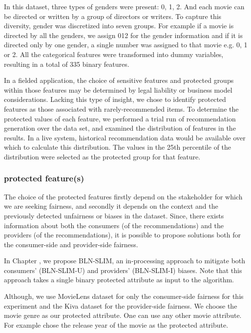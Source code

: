     
     In this dataset, three types of genders were present: 0, 1, 2. And each movie can be directed or written by a group of directors or writers. To capture this diversity, gender was discretized into seven groups. For example if a movie is directed by all the genders, we assign 012 for the gender information and if it is directed only by one gender, a single number was assigned to that movie e.g. 0, 1 or 2. All the categorical features were transformed into dummy variables, resulting in a total of 335 binary features.
    
    In a fielded application, the choice of sensitive features and protected groups within those features may be determined by legal liability or business model considerations. Lacking this type of insight, we chose to identify protected features as those associated with rarely-recommended items. To determine the protected values of each feature, we performed a trial run of recommendation generation over the data set, and examined the distribution of features in the results. In a live system, historical recommendation data would be available over which to calculate this distribution. The values in the 25th percentile of the distribution were selected as the protected group for that feature.

    
        \subsubsection{protected feature(s)}
        The choice of the protected features firstly depend on the stakeholder for which we are seeking fairness, and secondly it depends on the context and the previously detected unfairness or biases in the dataset. Since, there exists information about both the consumers (of the recommendations) and the providers (of the recommendations), it is possible to propose solutions both for the consumer-side and provider-side fairness.
        
        In Chapter , we propose BLN-SLIM, an in-processing approach to mitigate both consumers' (BLN-SLIM-U) and providers' (BLN-SLIM-I) biases. Note that this approach takes a single binary protected attribute as input to the algorithm.
        
        Although, we use MovieLens dataset for only the consumer-side fairness for this experiment and the Kiva dataset for the provider-side fairness. We choose the movie genre as our protected attribute. One can use any other movie attribute. For example \cite{kamishima2018recommendation} chose the release year of the movie as the protected attribute.
        

